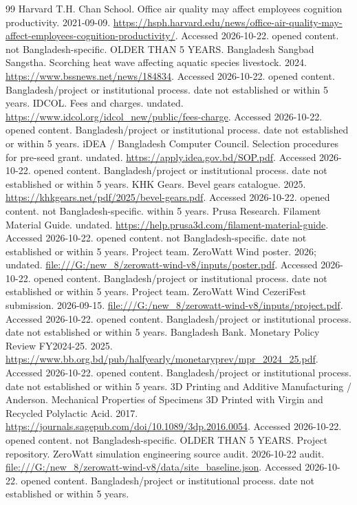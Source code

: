 \documentclass[11pt,a4paper]{article}
\begin{document}
\begin{thebibliography}{99}
 Harvard T.H. Chan School. Office air quality may affect employees cognition productivity. 2021-09-09. \url{https://hsph.harvard.edu/news/office-air-quality-may-affect-employees-cognition-productivity/}. Accessed 2026-10-22. opened content. not Bangladesh-specific. OLDER THAN 5 YEARS.
 Bangladesh Sangbad Sangstha. Scorching heat wave affecting aquatic species livestock. 2024. \url{https://www.bssnews.net/news/184834}. Accessed 2026-10-22. opened content. Bangladesh/project or institutional process. date not established or within 5 years.
 IDCOL. Fees and charges. undated. \url{https://www.idcol.org/idcol_new/public/fees-charge}. Accessed 2026-10-22. opened content. Bangladesh/project or institutional process. date not established or within 5 years.
 iDEA / Bangladesh Computer Council. Selection procedures for pre-seed grant. undated. \url{https://apply.idea.gov.bd/SOP.pdf}. Accessed 2026-10-22. opened content. Bangladesh/project or institutional process. date not established or within 5 years.
 KHK Gears. Bevel gears catalogue. 2025. \url{https://khkgears.net/pdf/2025/bevel-gears.pdf}. Accessed 2026-10-22. opened content. not Bangladesh-specific. within 5 years.
 Prusa Research. Filament Material Guide. undated. \url{https://help.prusa3d.com/filament-material-guide}. Accessed 2026-10-22. opened content. not Bangladesh-specific. date not established or within 5 years.
 Project team. ZeroWatt Wind poster. 2026; undated. \url{file:///G:/new_8/zerowatt-wind-v8/inputs/poster.pdf}. Accessed 2026-10-22. opened content. Bangladesh/project or institutional process. date not established or within 5 years.
 Project team. ZeroWatt Wind CezeriFest submission. 2026-09-15. \url{file:///G:/new_8/zerowatt-wind-v8/inputs/project.pdf}. Accessed 2026-10-22. opened content. Bangladesh/project or institutional process. date not established or within 5 years.
 Bangladesh Bank. Monetary Policy Review FY2024-25. 2025. \url{https://www.bb.org.bd/pub/halfyearly/monetaryprev/mpr_2024_25.pdf}. Accessed 2026-10-22. opened content. Bangladesh/project or institutional process. date not established or within 5 years.
 3D Printing and Additive Manufacturing / Anderson. Mechanical Properties of Specimens 3D Printed with Virgin and Recycled Polylactic Acid. 2017. \url{https://journals.sagepub.com/doi/10.1089/3dp.2016.0054}. Accessed 2026-10-22. opened content. not Bangladesh-specific. OLDER THAN 5 YEARS.
 Project repository. ZeroWatt simulation engineering source audit. 2026-10-22 audit. \url{file:///G:/new_8/zerowatt-wind-v8/data/site_baseline.json}. Accessed 2026-10-22. opened content. Bangladesh/project or institutional process. date not established or within 5 years.

\end{thebibliography}
\end{document}

